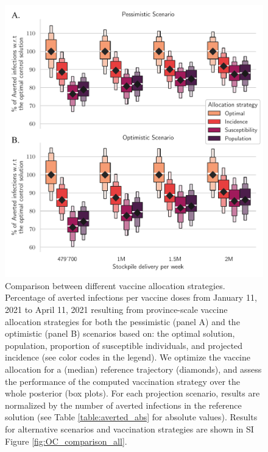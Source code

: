 \begin{figure}[!ht]
    \centering
    \includegraphics[width=\textwidth]{fig_italy-ocp/figures/scenarios_perturb_all.pdf}
    \caption[Comparison between different vaccine allocation strategies]{Comparison between different vaccine allocation strategies. Percentage of averted infections per vaccine doses from January 11, 2021 to April 11, 2021 resulting from province-scale vaccine allocation strategies for both the pessimistic (panel A) and the optimistic (panel B) scenarios based on: the optimal solution, population, proportion of susceptible individuals, and projected incidence (see color codes in the legend). We optimize the vaccine allocation for a (median) reference trajectory (diamonds), and assess the performance of the computed vaccination strategy over the whole posterior (box plots). For each projection scenario, results are normalized by the number of averted infections in the reference solution (see Table \ref{table:averted_abs} for absolute values). Results for alternative scenarios and vaccination strategies are shown in SI Figure \ref{fig:OC_comparison_all}.}
    \label{fig:OC_comparison}
\end{figure}

